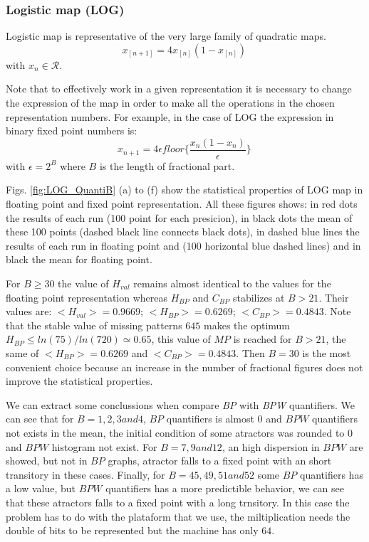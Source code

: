\subsubsection{Logistic map (LOG)} \label{subsubsec:log}

Logistic map is representative of the very large family of quadratic maps. 
\begin{equation}\label{eq:logimap}
 x_{[n+1]}=4x_{[n]}(1-x_{[n]}) \,
\end{equation}
with $x_n\in\mathcal{R}$.

Note that to effectively work in a given representation it is necessary to change the expression of the map in order to make all the operations in the chosen representation numbers. For example, in the case of LOG the expression in binary fixed point numbers is:
\begin{equation}\label{eq:logimapB2}
x_{n+1}=4 \epsilon floor\{\frac{x_n(1-x_n)}{\epsilon}\} \,
\end{equation}
with $\epsilon = 2^B$ where $B$ is the length of fractional part.

Figs. \ref{fig:LOG_QuantiB} (a) to (f) show the statistical properties of LOG map in floating point and fixed point representation.
All these figures shows: in red dots the results of each run (100 point for each presicion), in black dots the mean of these 100 points (dashed black line connects black dots), in dashed blue lines the results of each run in floating point and (100 horizontal blue dashed lines) and in black the mean for floating point.

For $B\geq 30$ the value of $H_{val}$ remains almost identical to the values for the floating point representation whereas $H_{BP}$ and $C_{BP}$ stabilizes at $B>21$.
Their values are: $<H_{val}>=0.9669$; $<H_{BP}>=0.6269$; $<C_{BP}>=0.4843$.
Note that the stable value of missing patterns $645$ makes the optimum $H_{BP} \leq ln(75)/ln(720) \simeq 0.65$, this value of $MP$ is reached for $B>21$, the same of $<H_{BP}>=0.6269$ and $<C_{BP}>=0.4843$.
Then $B=30$ is the most convenient choice because an increase in the number of fractional figures does not improve the statistical properties.

We can extract some conclussions when compare \textit{BP} with \textit{BPW} quantifiers.
We can see that for $B=1, 2, 3 and 4$, $BP$ quantifiers is almost $0$ and $BPW$ quantifiers not exists in the mean, the initial condition of some atractors was rounded to $0$ and $BPW$ histogram not exist.
For $B=7, 9 and 12$, an high dispersion in $BPW$ are showed, but not in $BP$ graphs, atractor falls to a fixed point with an short transitory in these cases.
Finally, for $B = 45, 49, 51 and 52$ some $BP$ quantifiers has a low value, but $BPW$ quantifiers has a more predictible behavior, we can see that these atractors falls to a fixed point with a long trnsitory.
In this case the problem has to do with the plataform that we use, the miltiplication needs the double of bits to be represented but the machine has only $64$.

